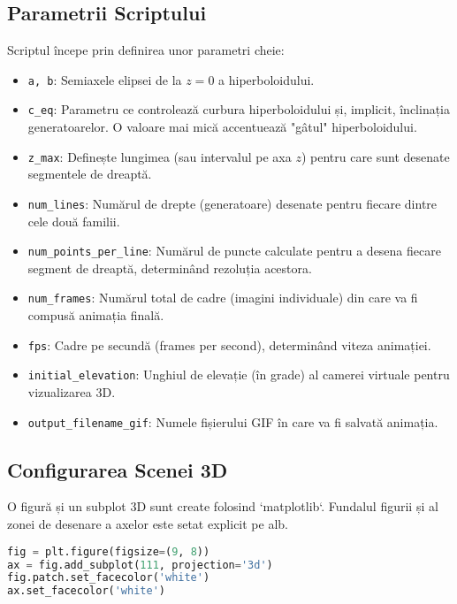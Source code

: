 \documentclass[a4paper,11pt]{article}
\begin{document}
\subsection{Parametrii Scriptului}
Scriptul începe prin definirea unor parametri cheie:
\begin{itemize}
    \item \texttt{a, b}: Semiaxele elipsei de la $z=0$ a hiperboloidului.
    \item \texttt{c\_eq}: Parametru ce controlează curbura hiperboloidului și, implicit, înclinația generatoarelor. O valoare mai mică accentuează "gâtul" hiperboloidului.
    \item \texttt{z\_max}: Definește lungimea (sau intervalul pe axa $z$) pentru care sunt desenate segmentele de dreaptă.
    \item \texttt{num\_lines}: Numărul de drepte (generatoare) desenate pentru fiecare dintre cele două familii.
    \item \texttt{num\_points\_per\_line}: Numărul de puncte calculate pentru a desena fiecare segment de dreaptă, determinând rezoluția acestora.
    \item \texttt{num\_frames}: Numărul total de cadre (imagini individuale) din care va fi compusă animația finală.
    \item \texttt{fps}: Cadre pe secundă (frames per second), determinând viteza animației.
    \item \texttt{initial\_elevation}: Unghiul de elevație (în grade) al camerei virtuale pentru vizualizarea 3D.
    \item \texttt{output\_filename\_gif}: Numele fișierului GIF în care va fi salvată animația.
\end{itemize}

\subsection{Configurarea Scenei 3D}
O figură și un subplot 3D sunt create folosind `matplotlib`. Fundalul figurii și al zonei de desenare a axelor este setat explicit pe alb.
\begin{lstlisting}[language=Python, firstnumber=16, caption=Configurarea figurii și axelor]
fig = plt.figure(figsize=(9, 8))
ax = fig.add_subplot(111, projection='3d')
fig.patch.set_facecolor('white') 
ax.set_facecolor('white') 
\end{lstlisting}
\end{document}
